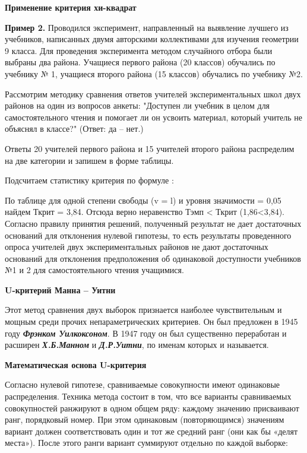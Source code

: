 \documentclass[12pt]{article}
\begin{document}
\medskip
\textbf{Применение критерия хи-квадрат}

\medskip
\textbf{Пример 2.} Проводился эксперимент, направленный на выявление лучшего из учебников, написанных двумя авторскими коллективами для изучения геометрии 9 класса. Для проведения эксперимента методом случайного отбора были выбраны два района. Учащиеся первого района (20 классов) обучались по учебнику № 1, учащиеся второго района (15 классов) обучались по учебнику №2.

Рассмотрим методику сравнения ответов учителей экспериментальных школ двух районов на один из вопросов анкеты: "Доступен ли учебник в целом для самостоятельного чтения и помогает ли он усвоить материал, который учитель не объяснял в классе?" (Ответ: да – нет.)

Ответы 20 учителей первого района и 15 учителей второго района распределим на две категории и запишем в форме таблицы.

Подсчитаем статистику критерия по формуле :
 
По таблице для одной степени свободы (v = l) и уровня значимости = 0,05 найдем  Ткрит = 3,84. Отсюда верно неравенство Тэмп < Ткрит (1,86<3,84). Согласно правилу принятия решений, полученный результат не дает достаточных оснований для отклонения нулевой гипотезы, то есть результаты проведенного опроса учителей двух экспериментальных районов не дают достаточных оснований для отклонения предположения об одинаковой доступности учебников №1 и 2 для самостоятельного чтения учащимися.

\medskip
\textbf{U-критерий Манна – Уитни}

\medskip
Этот метод сравнения двух выборок признается наиболее чувствительным и мощным среди прочих непараметрических критериев. Он был предложен в 1945 году \textbf{\textit{Фрэнком Уилкоксоном}}. В 1947 году он был существенно переработан и расширен \textbf{\textit{Х.Б.Манном}} и \textbf{\textit{Д.Р.Уитни}}, по именам которых и называется.

\medskip
\textbf{Математическая основа U-критерия}

\medskip
Согласно нулевой гипотезе, сравниваемые совокупности имеют одинаковые распределения. Техника метода состоит в том, что все варианты сравниваемых совокупностей ранжируют в одном общем ряду: каждому значению присваивают ранг, порядковый номер. При этом одинаковым (повторяющимся) значениям вариант должен соответствовать один и тот же средний ранг (они как бы «делят места»). После этого ранги вариант суммируют отдельно по каждой выборке:
\end{document}
